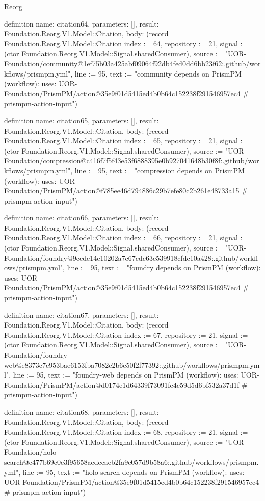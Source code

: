 \begin{lexlean}{Reorg}
\begin{semanticmodule}
definition{
  name: citation64,
  parameters: [],
  result: Foundation.Reorg.V1.Model::Citation,
  body: (record Foundation.Reorg.V1.Model::Citation {index := 64, repository := 21, signal := (ctor Foundation.Reorg.V1.Model::Signal.sharedConsumer), source := "UOR-Foundation/community@1ef75b03a425abf09064f92db4fed0dd6bb23f62:.github/workflows/prismpm.yml", line := 95, text := "community depends on PrismPM (workflow): uses: UOR-Foundation/PrismPM/action@35e9f01d5415ed4b0b64c152238f291546957ec4 # prismpm-action-input"})
}

definition{
  name: citation65,
  parameters: [],
  result: Foundation.Reorg.V1.Model::Citation,
  body: (record Foundation.Reorg.V1.Model::Citation {index := 65, repository := 21, signal := (ctor Foundation.Reorg.V1.Model::Signal.sharedConsumer), source := "UOR-Foundation/compression@c416f7f5f43e53f6888395e0b927041648b30f8f:.github/workflows/prismpm.yml", line := 95, text := "compression depends on PrismPM (workflow): uses: UOR-Foundation/PrismPM/action@f785ee46d794886c29b7efe80c2b261e48733a15 # prismpm-action-input"})
}

definition{
  name: citation66,
  parameters: [],
  result: Foundation.Reorg.V1.Model::Citation,
  body: (record Foundation.Reorg.V1.Model::Citation {index := 66, repository := 21, signal := (ctor Foundation.Reorg.V1.Model::Signal.sharedConsumer), source := "UOR-Foundation/foundry@9ccde14c10202a7c67cdc63e539918cfdc10a428:.github/workflows/prismpm.yml", line := 95, text := "foundry depends on PrismPM (workflow): uses: UOR-Foundation/PrismPM/action@35e9f01d5415ed4b0b64c152238f291546957ec4 # prismpm-action-input"})
}

definition{
  name: citation67,
  parameters: [],
  result: Foundation.Reorg.V1.Model::Citation,
  body: (record Foundation.Reorg.V1.Model::Citation {index := 67, repository := 21, signal := (ctor Foundation.Reorg.V1.Model::Signal.sharedConsumer), source := "UOR-Foundation/foundry-web@e8373c7c953bae6153fba7082c2b6c50f2f77392:.github/workflows/prismpm.yml", line := 95, text := "foundry-web depends on PrismPM (workflow): uses: UOR-Foundation/PrismPM/action@d0174e1d64339f73091fe4c59d5d6bf532a37d1f # prismpm-action-input"})
}

definition{
  name: citation68,
  parameters: [],
  result: Foundation.Reorg.V1.Model::Citation,
  body: (record Foundation.Reorg.V1.Model::Citation {index := 68, repository := 21, signal := (ctor Foundation.Reorg.V1.Model::Signal.sharedConsumer), source := "UOR-Foundation/holo-search@c477b69c0e3f95658aedecaeb2fa9c057d9b58a6:.github/workflows/prismpm.yml", line := 95, text := "holo-search depends on PrismPM (workflow): uses: UOR-Foundation/PrismPM/action@35e9f01d5415ed4b0b64c152238f291546957ec4 # prismpm-action-input"})
}


\end{semanticmodule}
\end{lexlean}
